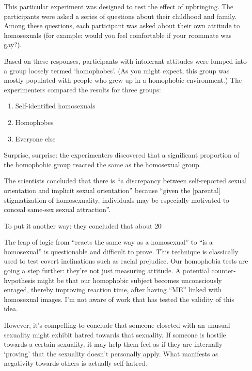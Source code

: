 This particular experiment was designed to test the effect of upbringing. The participants were asked a series of questions about their childhood and family. Among these questions, each participant was asked about their own attitude to homosexuals (for example: would you feel comfortable if your roommate was gay?).

Based on these responses, participants with intolerant attitudes were lumped into a group loosely termed ‘homophobes'. (As you might expect, this group was mostly populated with people who grew up in a homophobic environment.) The experimenters compared the results for three groups:

\begin{enumerate}
  \item Self-identified homosexuals
  \item Homophobes
  \item Everyone else
\end{enumerate}

Surprise, surprise: the experimenters discovered that a significant proportion of the homophobic group reacted the same as the homosexual group.

The scientists concluded that there is ``a discrepancy between self-reported sexual orientation and implicit sexual orientation'' because ``given the [parental] stigmatization of homosexuality, individuals may be especially motivated to conceal same-sex sexual attraction''.

To put it another way: they concluded that about 20%

The leap of logic from ``reacts the same way as a homosexual'' to ``is a homosexual'' is questionable and difficult to prove. This technique is classically used to test covert inclinations such as racial prejudice. Our homophobia tests are going a step further: they're not just measuring attitude. A potential counter-hypothesis might be that our homophobic subject becomes unconsciously enraged, thereby improving reaction time, after having ``ME'' linked with homosexual images. I'm not aware of work that has tested the validity of this idea.

However, it's compelling to conclude that someone closeted with an unusual sexuality might exhibit hatred towards that sexuality. If someone is hostile towards a certain sexuality, it may help them feel as if they are internally ‘proving' that the sexuality doesn't personally apply. What manifests as negativity towards others is actually self-hatred.

